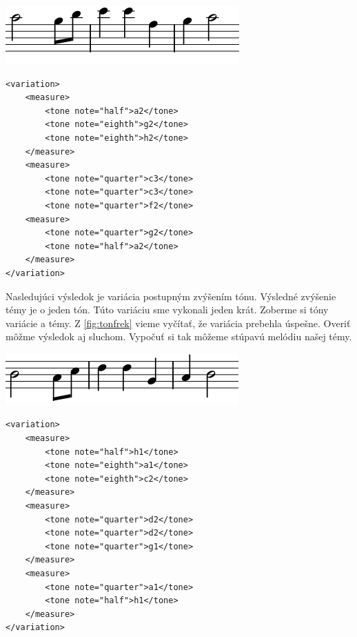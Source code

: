 \begin{minipage}{.45\textwidth}
\includegraphics[width=\textwidth]{thesis/obrazky-figures/var22.png}
\end{minipage}%
\begin{minipage}{.5\textwidth}
\centering
\lstset{language=XML}
\begin{lstlisting}[basicstyle=\tiny]
<variation>
    <measure>
        <tone note="half">a2</tone>
        <tone note="eighth">g2</tone>
        <tone note="eighth">h2</tone>
    </measure>
    <measure>
        <tone note="quarter">c3</tone>
        <tone note="quarter">c3</tone>
        <tone note="quarter">f2</tone>
    <measure>
        <tone note="quarter">g2</tone>
        <tone note="half">a2</tone>
    </measure>
</variation>
\end{lstlisting}
\end{minipage}

Nasledujúci výsledok je variácia postupným zvýšením tónu. Výsledné zvýšenie témy je o jeden tón. Túto variáciu sme vykonali jeden krát. Zoberme si tóny variácie a témy. Z \ref{fig:tonfrek} vieme vyčítať, že variácia prebehla úspešne. Overiť môžme výsledok aj sluchom. Vypočuť si tak môžeme stúpavú melódiu našej témy.

\begin{minipage}{.45\textwidth}
\includegraphics[width=\textwidth]{thesis/obrazky-figures/var3.png}
\end{minipage}%
\begin{minipage}{.5\textwidth}

\lstset{language=XML}
\begin{lstlisting}[basicstyle=\tiny]
<variation>
    <measure>
        <tone note="half">h1</tone>
        <tone note="eighth">a1</tone>
        <tone note="eighth">c2</tone>
    </measure>
    <measure>
        <tone note="quarter">d2</tone>
        <tone note="quarter">d2</tone>
        <tone note="quarter">g1</tone>
    </measure>
    <measure>
        <tone note="quarter">a1</tone>
        <tone note="half">h1</tone>
    </measure>
</variation>
\end{lstlisting}
\end{minipage}

